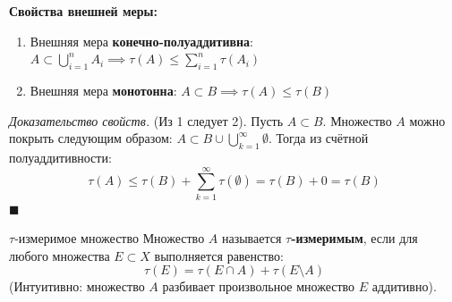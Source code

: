 \documentclass[12pt,a4paper]{article}
\newenvironment{Proof}[1][Доказательство]{\vspace{0.5em}\noindent\textit{#1.}\hspace{0.5em}\ignorespaces}{\hfill$\blacksquare$\vspace{1em}}
\begin{document}
\noindent \textbf{Свойства внешней меры:}
\begin{enumerate}
    \item Внешняя мера \textbf{конечно-полуаддитивна}: $ A \subset \bigcup\limits_{i=1}^n A_i \implies \tau(A) \le \sum\limits_{i=1}^n \tau(A_i) $
    \item Внешняя мера \textbf{монотонна}: $ A \subset B \implies \tau(A) \le \tau(B) $
\end{enumerate}

\begin{Proof}[Доказательство свойств]
(Из 1 следует 2). Пусть $A \subset B$. Множество $A$ можно покрыть следующим образом: $A \subset B \cup \bigcup\limits_{k=1}^{\infty} \emptyset$. Тогда из счётной полуаддитивности:
$$ \tau(A) \le \tau(B) + \sum\limits_{k=1}^{\infty} \tau(\emptyset) = \tau(B) + 0 = \tau(B) $$
\end{Proof}

\begin{Definition}{$\tau$-измеримое множество}{}
Множество $A$ называется \textbf{$\tau$-измеримым}, если для любого множества $E \subset X$ выполняется равенство:
$$ \tau(E) = \tau(E \cap A) + \tau(E \setminus A) $$
(Интуитивно: множество $A$ разбивает произвольное множество $E$ аддитивно).
\end{Definition}

\begin{center}
\end{center}
\end{document}
